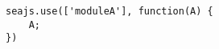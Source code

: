 
\lstset{language=C}

\begin{lstlisting}[frame=single]
seajs.use(['moduleA'], function(A) {
	A;
})
\end{lstlisting}